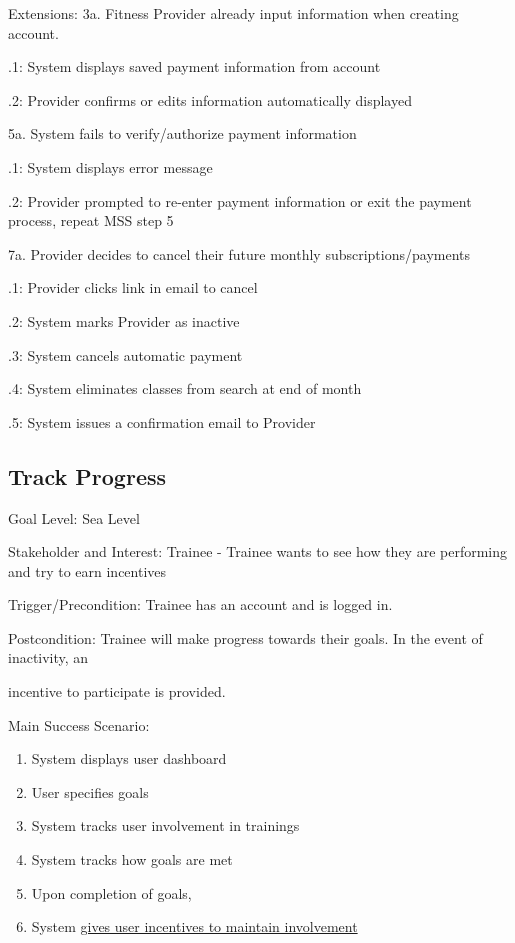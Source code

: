 \documentclass[12pt]{article}
\begin{document}
\noindent Extensions: 
\noindent 3a. Fitness Provider already input information when creating account.

	.1: System displays saved payment information from account
	
	.2: Provider confirms or edits information automatically displayed
	
\noindent 5a. System fails to verify/authorize payment information
	
	.1: System displays error message
	
	.2: Provider prompted to re-enter payment information or exit the payment process, repeat MSS step 5

\noindent 7a. Provider decides to cancel their future monthly subscriptions/payments
	
	.1: Provider clicks link in email to cancel
	
	.2: System marks Provider as inactive 
	
	.3: System cancels automatic payment
	
	.4: System eliminates classes from search at end of month
	
	.5: System issues a confirmation email to Provider

\subsection{Track Progress}
\noindent Goal Level: Sea Level
\newline

\noindent Stakeholder and Interest: Trainee - Trainee wants to see how they are performing and try to earn incentives 
\newline

\noindent Trigger/Precondition: Trainee has an account and is logged in.

\noindent Postcondition: Trainee will make progress towards their goals. In the event of inactivity, an 

incentive to participate is provided.
\newline

\noindent Main Success Scenario:
\begin{enumerate}
\item System displays user dashboard
\item User specifies goals
\item System tracks user involvement in trainings
\item System tracks how goals are met
\item Upon completion of goals, 
\item System \underline{gives user incentives to maintain involvement}
\end{enumerate}
\end{document}
